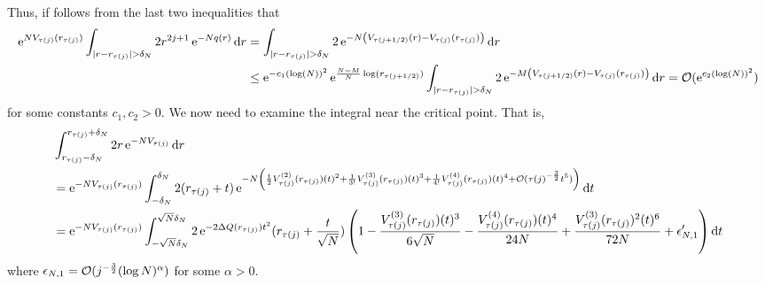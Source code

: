 Thus, if follows from the last two inequalities that
\begin{align}
	\operatorname{e}^{N V_{\tau(j)}(r_{\tau(j)})} \int_{|r - r_{\tau(j)}| > \delta_N} 2 r^{2j+1} \operatorname{e}^{-N q(r)} \mathrm{d} r & = \int_{|r - r_{\tau(j)}| > \delta_N} 2 \operatorname{e}^{-N \left( V_{\tau(j + 1/2)}(r) - V_{\tau(j)}(r_{\tau(j)}) \right)} \mathrm{d} r \\
	& \leq \operatorname{e}^{-c_1 (\log(N))^2} \operatorname{e}^{\frac{N-M}{N} \log(r_{\tau(j+1/2)})}  \int_{|r - r_{\tau(j)}| > \delta_N} 2 \operatorname{e}^{-M \left( V_{\tau(j + 1/2)}(r) - V_{\tau(j)}(r_{\tau(j)}) \right)} \mathrm{d} r = \mathcal{O}(\operatorname{e}^{c_2 (\log(N))^2})
\end{align}
for some constants $c_1, c_2 > 0$. We now need to examine the integral near the critical point. That is, 
\begin{align}
	& \int_{r_{\tau(j)} - \delta_N}^{r_{\tau(j)} + \delta_N} 2r \operatorname{e}^{-N V_{\tau(j)}} \mathrm{d} r \\
	& =  \operatorname{e}^{-N V_{\tau(j)}(r_{\tau(j)})} \int_{-\delta_N}^{\delta_N} 2(r_{\tau(j)} + t) \operatorname{e}^{-N \left( \frac{1}{2} V^{(2)}_{\tau(j)}(r_{\tau(j)}) (t)^2 + \frac{1}{3!} V^{(3)}_{\tau(j)}(r_{\tau(j)}) (t)^3 + \frac{1}{4!} V^{(4)}_{\tau(j)}(r_{\tau(j)}) (t)^4 + \mathcal{O}(\tau(j)^{-\frac{3}{2}}  t^5) \right)} \mathrm{d} t \\
	&  =  \operatorname{e}^{-N V_{\tau(j)}(r_{\tau(j)})}  \int_{-\sqrt{N} \delta_N}^{\sqrt{N} \delta_N} 2 \operatorname{e}^{-2\Delta Q(r_{\tau(j)}) t^2} (r_{\tau(j)} + \frac{t}{\sqrt{N}})  \left(  1 - \frac{V^{(3)}_{\tau(j)}(r_{\tau(j)}) (t)^3 }{6 \sqrt{N}} - \frac{V^{(4)}_{\tau(j)}(r_{\tau(j)}) (t)^4}{24 N} + \frac{V^{(3)}_{\tau(j)}(r_{\tau(j)})^2 (t)^6}{72 N} + \epsilon'_{N,1} \right) \mathrm{d} t
\end{align}
where  $\epsilon_{N,1} = \mathcal{O}(j^{-\frac{3}{2}} (\log N)^\alpha)$ for some $\alpha > 0$.

